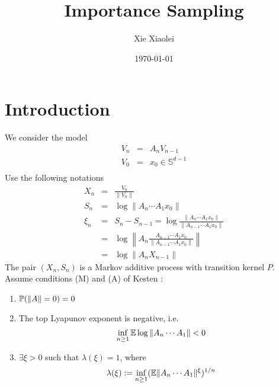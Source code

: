 \documentclass{article}
\title{Importance Sampling}
\author{Xie Xiaolei}
\date{\today}
\begin{document}
\maketitle
\section{Introduction}
We consider the model
\begin{eqnarray*}
V_n &=& A_n V_{n-1} \\
V_0 &=& x_0 \in \mathbb S^{d-1}\\
\end{eqnarray*}
Use the following notations
\begin{eqnarray*}
X_n &=& \frac{V_n}{\|V_n\|} \\
S_n &=& \log \|A_n \cdots A_1 x_0\| \\
\xi_n &=& S_n - S_{n-1} = \log\frac{\|A_n \cdots A_1 x_0\|}{\|A_{n-1}
  \cdots A_1 x_0\|} \\
&=& \log\left\| A_n \frac{A_{n-1} \cdots A_1 x_0}{\|A_{n-1} \cdots A_1
    x_0\|} \right\|\\
&=& \log \|A_n X_{n-1}\|
\end{eqnarray*}
The pair $(X_n, S_n)$ is a Markov additive process with transition
kernel $P$. Assume conditions (M) and (A) of Kesten \cite{Kesten1973}:
\begin{enumerate}
\item $\P(\|A\| = 0) = 0$
\item The top Lyapunov exponent is negative, i.e.
  \begin{equation}
    \label{eq:neg_top_Lyapunov}
    \inf_{n \geq 1} \E \log \|A_n \cdots A_1\| < 0    
  \end{equation}
\item $\exists \xi > 0$ such that $\lambda(\xi) = 1$, where
  $$
  \lambda(\xi) := \inf_{n \geq 1} (\E \|A_n \cdots A_1\|^\xi)^{1/n}
  $$
\end{enumerate}
\end{document}

